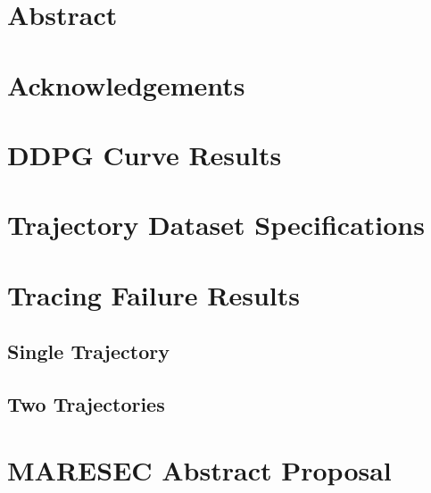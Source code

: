 \documentclass[12pt]{scrartcl}
\begin{document}

\section*{Abstract}

\newpage
\section*{Acknowledgements}

\newpage
\tableofcontents
\newpage

\listoffigures
\listoftables
\newpage
\noindent



\newpage


\newpage

\appendix
\section{DDPG Curve Results} \label{appendix:curveResults}

\section{Trajectory Dataset Specifications}\label{appendix:datasets}


\section{Tracing Failure Results}
\subsection{Single Trajectory}\label{appendix:single}

\subsection{Two Trajectories}\label{appendix:double}



\section{MARESEC Abstract Proposal}\label{appendix:maresec}

\end{document}

